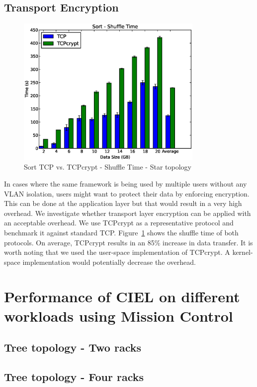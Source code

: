 \documentclass[a4paper,12pt,twoside,openright]{report}
\begin{document}
\subsection{Transport Encryption}
\begin{figure}[h!]
  \centering
    \includegraphics[width=0.8\textwidth]{shuffle_sort_tcpcrypt.eps}
    \caption{Sort TCP vs. TCPcrypt - Shuffle Time - Star topology}
    \label{chap:eval:sec:ciel:fig:sortshuffletcpcrypt}
\end{figure}
In cases where the same framework is being used by multiple users without any
VLAN isolation, users might want to protect their data by enforcing encryption.
This can be done at the application layer but that would result in a very high
overhead. We investigate whether transport layer encryption can be applied with
an acceptable overhead. We use TCPcrypt as a representative protocol and
benchmark it against standard TCP.
Figure~\ref{chap:eval:sec:ciel:fig:sortshuffletcpcrypt} shows the shuffle time
of both protocols. On average, TCPcrypt results in an 85\% increase in data
transfer. It is worth noting that we used the user-space implementation of
TCPcrypt. A kernel-space implementation would potentially decrease the overhead.

\section{Performance of CIEL on different workloads using Mission Control}

\subsection{Tree topology - Two racks}
\subsection{Tree topology - Four racks}
\end{document}
